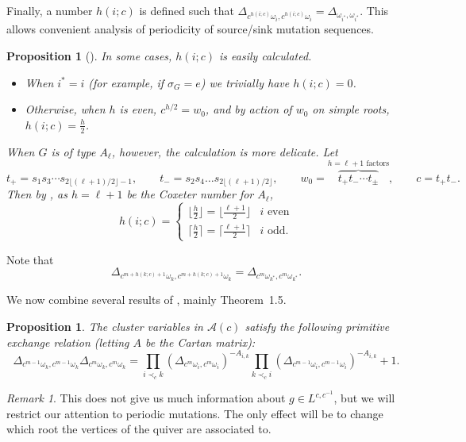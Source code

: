 \documentclass{amsart}
\theoremstyle{plain}
\newtheorem{proposition}[theorem]{Proposition}
\theoremstyle{definition}
\theoremstyle{remark}
\newtheorem{remark}[theorem]{Remark}
\newcommand{\fundamentalweight}{\omega}
\newcommand{\genminoryz}[3]{\Delta_{{#1} \fundamentalweight_{#3}, {#2}%
    \fundamentalweight_{#3}}}
\begin{document}
  Finally, a number $h(i;c)$ is defined such that
  $\genminoryz{c^{h(i;c)}}{c^{h(i;c)}}{i} = \genminoryz{}{}{i^{\ast}}$.
  This allows convenient analysis of periodicity of source/sink mutation
  sequences.
  \begin{proposition}[{\cite[Equation~2.13]{yangzelevinsky2008}}]
    \label{prop:def-h(i;c)}
    In some cases, $h(i;c)$ is easily calculated.
    \begin{itemize}
    \item
      When $i^{\ast} = i$ (for example, if $\sigma_G = e$) we trivially
      have $h(i;c) = 0$.
    \item
      Otherwise, when $h$ is even, $c^{h/2} = w_0$, and by action of
      $w_0$ on simple roots, $h(i;c) = \frac{h}{2}$.
    \end{itemize}
    When $G$ is of type $A_{\ell}$, however, the calculation is more
    delicate. Let \[ t_{+} = s_1 s_3 \dotsb s_{2 \lfloor (\ell+1)/2
        \rfloor - 1}, \qquad t_{-} = s_2 s_4 \dotsc s_{2 \lfloor
        (\ell+1)/2 \rfloor}, \qquad w_0 = \overbrace{t_{+} t_{-} \dotsb
        t_{\pm}}^{\text{$h = \ell + 1$ factors}}, \qquad c = t_{+}
      t_{-}. \] Then by \cite[Equation~2.13]{yangzelevinsky2008}, as $h
    = \ell + 1$ be the Coxeter number for $A_{\ell}$, \[ h(i;c) =
      \begin{cases} \lfloor \frac{h}{2} \rfloor = \lfloor \frac{\ell +
          1}{2} \rfloor & \text{$i$ even} \\ \lceil \frac{h}{2} \rceil =
        \lceil \frac{\ell + 1}{2} \rceil & \text{$i$ odd.} \end{cases}
    \]
  \end{proposition}
  Note that \[ \genminoryz{c^{m + h(k;c) + 1}}{c^{m + h(k;c) + 1}}{k} =
    \genminoryz{c^m}{c^m}{k^{\ast}}. \]

  We now combine several results of \cite{yangzelevinsky2008}, mainly
  Theorem~1.5.

  \begin{proposition}
    \label{prop:compressed-yang-zelevinsky}
    The cluster variables in $\mathcal{A}(c)$ satisfy the following
    primitive exchange relation (letting $A$ be the Cartan matrix): \[
      \genminoryz{c^{m-1}}{c^{m-1}}{k} \genminoryz{c^m}{c^m}{k} =
      \prod_{i \prec_{c} k} (\genminoryz{c^m}{c^m}{i})^{-A_{i,k}}
      \prod_{k \prec_{c} i}
      (\genminoryz{c^{m-1}}{c^{m-1}}{i})^{-A_{i,k}} + 1. \]
  \end{proposition}

  \begin{remark}
    This does not give us much information about $g \in L^{c,c^{-1}}$,
    but we will restrict our attention to periodic mutations. The only
    effect will be to change which root the vertices of the quiver are
    associated to.
  \end{remark}
\end{document}
